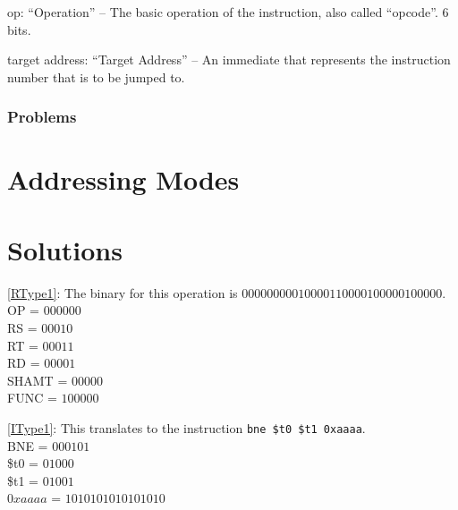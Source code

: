 \documentclass{article}
\begin{document}
op: ``Operation'' -- The basic operation of the instruction, also called ``opcode''. 6 bits.

target address: ``Target Address'' -- An immediate that represents the instruction number that is to be jumped to. 

\subsubsection{Problems}\label{JTypeProblems}



\section{Addressing Modes}\label{Addressing}

\section{Solutions}

\ref{RType1}: The binary for this operation is $000000 00010 00011 00001 00000 100000$. \\ OP = $000000$ \\ RS = $00010$ \\ RT = $00011$ \\ RD = $00001$ \\ SHAMT = $00000$ \\ FUNC = $100000$

\ref{IType1}: This translates to the instruction \texttt{bne \$t0 \$t1 0xaaaa}. \\ BNE = $000101$ \\ \$t0 = $01000$ \\ \$t1 = $01001$ \\ $0xaaaa$ = $1010101010101010$

\printindex
\end{document}

